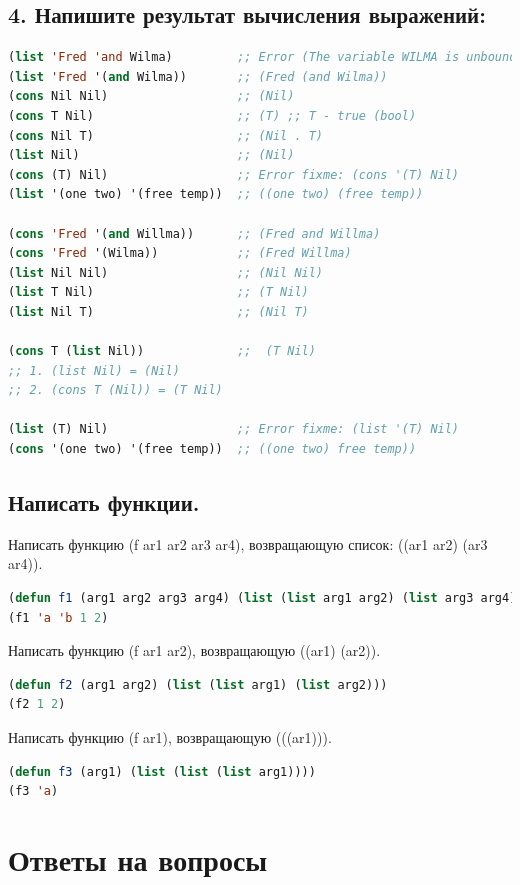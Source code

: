 \section{4. Напишите результат вычисления выражений:}

\begin{lstlisting}[language=Lisp]
(list 'Fred 'and Wilma) 		;; Error (The variable WILMA is unbound). 
(list 'Fred '(and Wilma)) 		;; (Fred (and Wilma))
(cons Nil Nil)					;; (Nil)
(cons T Nil)					;; (T) ;; T - true (bool)
(cons Nil T)					;; (Nil . T)
(list Nil)						;; (Nil)
(cons (T) Nil)					;; Error fixme: (cons '(T) Nil)
(list '(one two) '(free temp)) 	;; ((one two) (free temp))

(cons 'Fred '(and Willma))		;; (Fred and Willma)
(cons 'Fred '(Wilma))			;; (Fred Willma)
(list Nil Nil)					;; (Nil Nil)
(list T Nil)					;; (T Nil)
(list Nil T)					;; (Nil T)

(cons T (list Nil))				;;  (T Nil)
;; 1. (list Nil) = (Nil)
;; 2. (cons T (Nil)) = (T Nil)

(list (T) Nil)					;; Error fixme: (list '(T) Nil)
(cons '(one two) '(free temp))	;; ((one two) free temp))
\end{lstlisting}

\section{Написать функции.}

Написать функцию (f ar1 ar2 ar3 ar4), возвращающую список: ((ar1 ar2) (ar3 ar4)).
\begin{lstlisting}[language=Lisp]
(defun f1 (arg1 arg2 arg3 arg4) (list (list arg1 arg2) (list arg3 arg4)))
(f1 'a 'b 1 2)
\end{lstlisting}

Написать функцию (f ar1 ar2), возвращающую ((ar1) (ar2)).
\begin{lstlisting}[language=Lisp]
(defun f2 (arg1 arg2) (list (list arg1) (list arg2)))
(f2 1 2)
\end{lstlisting}

Написать функцию (f ar1), возвращающую (((ar1))).
\begin{lstlisting}[language=Lisp]
(defun f3 (arg1) (list (list (list arg1))))
(f3 'a)
\end{lstlisting}

\chapter{Ответы на вопросы}

